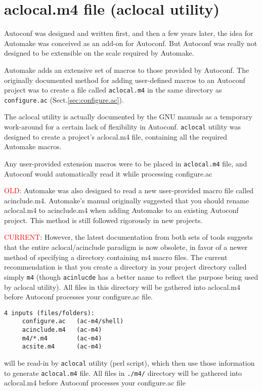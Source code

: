 \section{aclocal.m4 file (aclocal utility)}
\label{sec:aclocal.m4}

Autoconf was designed and written first, and then a few years later, the idea
for Automake was conceived as an add-on for Autoconf. But Autoconf was really
not designed to be extensible on the scale required by Automake.

Automake adds an extensive set of macros to those provided by Autoconf. The
originally documented method for adding user-defined macros to an Autoconf
project was to create a file called \verb!aclocal.m4! in the same directory as
\verb!configure.ac! (Sect.\ref{sec:configure.ac}).

The aclocal utility is actually documented by the GNU manuals as a temporary
work-around for a certain lack of flexibility in Autoconf. 
\verb!aclocal! utility was designed to create a project's aclocal.m4 file,
containing all the required Automake macros. 

Any user-provided extension macros were to be placed in \verb!aclocal.m4! file,
and Autoconf would automatically read it while processing configure.ac

\textcolor{red}{OLD}: Automake was also designed to read a new user-provided
macro file called acinclude.m4. Automake's manual originally suggested that you should rename
aclocal.m4 to acinclude.m4 when adding Automake to an existing Autoconf project.
This method is still followed rigorously in new projects. 

\textcolor{red}{CURRENT}: However, the latest documentation from both sets of
tools suggests that the entire aclocal/acinclude paradigm is now obsolete, in
favor of a newer method of specifying a directory containing m4 macro files.
The current recommendation is that you create a directory in your project
directory called simply  \verb!m4! (though \verb!acinlucde! has a better name
to reflect the purpose being used by aclocal utility). 
All files in this directory will be gathered into aclocal.m4 before Autoconf
processes your configure.ac file.


\begin{verbatim}
4 inputs (files/folders):
     configure.ac   (ac-m4/shell)
     acinclude.m4   (ac-m4)
     m4/*.m4        (ac-m4)
     acsite.m4      (ac-m4)
\end{verbatim}
will be read-in by \verb!aclocal! utility (perl script), which then use those
information to generate \verb!aclocal.m4! file.
All files in \verb!./m4/! directory will be gathered into aclocal.m4 before
Autoconf processes your configure.ac file




